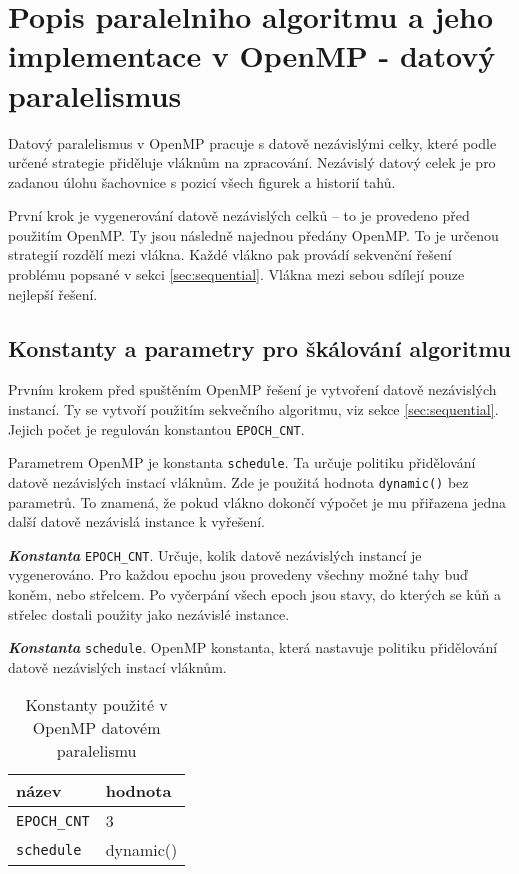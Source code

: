 \documentclass{article}
\newcommand{\const}[1]{\texttt{#1}}
\newcommand{\konstanta}[1]{\textbf{\textit{Konstanta}} \const{#1}.}
\begin{document}
    \label{sec:data-par}
    \section{Popis paralelniho algoritmu a jeho implementace v OpenMP - datový paralelismus}
    Datový paralelismus v OpenMP pracuje s datově nezávislými celky, které podle určené
    strategie přiděluje vláknům na zpracování. Nezávislý datový celek je pro zadanou úlohu
    šachovnice s pozicí všech figurek a historií tahů.

    První krok je vygenerování datově nezávislých celků – to je provedeno před použitím OpenMP.
    Ty jsou následně najednou předány OpenMP. To je určenou strategií rozdělí mezi vlákna.
    Každé vlákno pak provádí sekvenční řešení problému popsané v sekci \ref{sec:sequential}.
    Vlákna mezi sebou sdílejí pouze nejlepší řešení.

    \subsection{Konstanty a parametry pro škálování algoritmu}
    Prvním krokem před spuštěním OpenMP řešení je vytvoření datově nezávislých instancí.
    Ty se vytvoří použitím sekvečního algoritmu, viz sekce \ref{sec:sequential}.
    Jejich počet je regulován konstantou \const{EPOCH_CNT}.

    Parametrem OpenMP je konstanta \const{schedule}. Ta určuje politiku přidělování datově nezávislých instací vláknům.
    Zde je použitá hodnota \const{dynamic()} bez parametrů. To znamená, že pokud vlákno dokončí výpočet je mu
    přiřazena jedna další datově nezávislá instance k vyřešení.

    \konstanta{EPOCH_CNT} Určuje, kolik datově nezávislých instancí je vygenerováno.
    Pro každou epochu jsou provedeny všechny možné tahy buď koněm, nebo střelcem.
    Po vyčerpání všech epoch jsou stavy, do kterých se kůň a střelec dostali
    použity jako nezávislé instance.

    \konstanta{schedule} OpenMP konstanta, která nastavuje politiku přidělování datově nezávislých instací vláknům.

    \begin{table}[hb]
        \centering
        \begin{tabular}{|l|l|}
            \hline
            název      & hodnota \\ \hline
            \const{EPOCH_CNT} & 3       \\ \hline
            \const{schedule} & dynamic()      \\ \hline
        \end{tabular}
        \caption{Konstanty použité v OpenMP datovém paralelismu}
        \label{tab:data-par-constants}
    \end{table}
\end{document}
